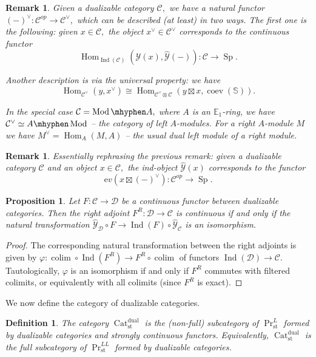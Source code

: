 \documentclass[11pt,leqno]{amsart}
\newtheorem{defi}[theo]{Definition}
\newtheorem{prop}[theo]{Proposition}
\newtheorem{remark}[theo]{Remark}
\numberwithin{equation}{section}
\def\bS{\mathbb{S}}
\def\Hom{\operatorname{Hom}}
\DeclareMathOperator*{\colim}{colim}
\newcommand{\hy}{\mhyphen}
\newcommand{\Cat}{\operatorname{Cat}}
\newcommand{\st}{\operatorname{st}}
\newcommand{\dual}{\operatorname{dual}}
\newcommand{\bE}{{\mathbb E}}
\newcommand{\ev}{\mathrm ev}
\newcommand{\cD}{{\mathcal D}}
\newcommand{\cC}{{\mathcal C}}
\newcommand{\cY}{{\mathcal Y}}
\newcommand{\Sp}{\operatorname{Sp}}
\newcommand{\Ind}{\operatorname{Ind}}
\newcommand{\coev}{\operatorname{coev}}
\newcommand{\Mod}{\operatorname{Mod}}
\begin{document}
\begin{remark}\label{rem:functor_-^vee} Given a dualizable category $\cC,$ we have a natural functor $(-)^{\vee}:\cC^{op}\to\cC^{\vee},$ which can be described (at least) in two ways. The first one is the following: given $x\in\cC,$ the object $x^{\vee}\in\cC^{\vee}$ corresponds to the continuous functor $$\Hom_{\Ind(\cC)}(\cY(x),\hat{\cY}(-)):\cC\to\Sp.$$

Another description is via the universal property: we have 
$$\Hom_{\cC^{\vee}}(y,x^{\vee})\cong \Hom_{\cC^{\vee}\otimes\cC}(y\boxtimes x,\coev(\bS)).$$

In the special case $\cC=\Mod\hy A,$ where $A$ is an $\bE_1$-ring, we have $\cC^{\vee}\simeq A\hy\Mod$ -- the category of left $A$-modules. For a right $A$-module $M$ we have $M^{\vee}=\Hom_A(M,A)$ -- the usual dual left module of a right module. 
\end{remark}

\begin{remark}Essentially rephrasing the previous remark: given a dualizable category $\cC$ and an object $x\in\cC,$ the ind-object $\hat{\cY}(x)$ corresponds to the functor $$\ev(x\boxtimes (-)^{\vee}):\cC^{op}\to\Sp.$$\end{remark}

\begin{prop}\label{prop:strong_continuity_via_hat_Y} Let $F:\cC\to\cD$ be a continuous functor between dualizable categories. Then the right adjoint $F^R:\cD\to\cC$ is continuous if and only if the natural transformation $\hat{\cY}_{\cD}\circ F\to \Ind(F)\circ\hat{\cY}_{\cC}$ is an isomorphism.\end{prop}

\begin{proof}The corresponding natural transformation between the right adjoints is given by $\varphi:\colim\circ\Ind(F^R)\to F^R\circ\colim$ of functors $\Ind(\cD)\to\cC.$ Tautologically, $\varphi$ is an isomorphism if and only if $F^R$ commutes with filtered colimits, or equivalently with all colimits (since $F^R$ is exact).\end{proof}

We now define the category of dualizable categories.

\begin{defi}The category $\Cat_{\st}^{\dual}$ is the (non-full) subcategory of $\Pr^L_{\st}$ formed by dualizable categories and strongly continuous functors. Equivalently, $\Cat_{\st}^{\dual}$ is the full subcategory of $\Pr^{LL}_{\st}$ formed by dualizable categories.\end{defi}
\end{document}
